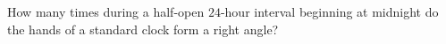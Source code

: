 How many times during a half-open $24$-hour interval beginning at midnight do the hands of a standard clock form a right angle?
